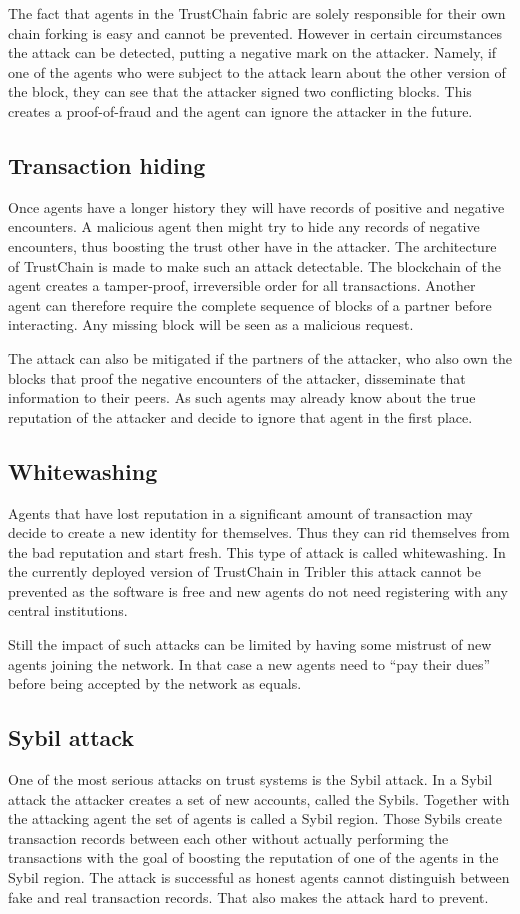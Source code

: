The fact that agents in the TrustChain fabric are solely responsible for their own chain forking is
easy and cannot be prevented. However in certain circumstances the attack can be detected, putting a
negative mark on the attacker. Namely, if one of the agents who were subject to the attack learn 
about the other version of the block, they can see that the attacker signed two conflicting blocks.
This creates a proof-of-fraud and the agent can ignore the attacker in the future. 

\subsection{Transaction hiding}
Once agents have a longer history they will have records of positive and negative encounters. A 
malicious agent then might try to hide any records of negative encounters, thus boosting the trust 
other have in the attacker. The architecture of TrustChain is made to make such an attack detectable.
The blockchain of the agent creates a tamper-proof, irreversible order for all transactions. Another
agent can therefore require the complete sequence of blocks of a partner before interacting. Any 
missing block will be seen as a malicious request. 

The attack can also be mitigated if the partners of the attacker, who also own the blocks that proof
the negative encounters of the attacker, disseminate that information to their peers. As such agents
may already know about the true reputation of the attacker and decide to ignore that agent in the 
first place.

\subsection{Whitewashing}
Agents that have lost reputation in a significant amount of transaction may decide to create a new 
identity for themselves. Thus they can rid themselves from the bad reputation and start fresh. This 
type of attack is called whitewashing. In the currently deployed version of TrustChain in Tribler 
this attack cannot be prevented as the software is free and new agents do not need registering with
any central institutions.

Still the impact of such attacks can be limited by having some mistrust of new agents joining the 
network. In that case a new agents need to ``pay their dues'' before being accepted by the network 
as equals.

\subsection{Sybil attack}
One of the most serious attacks on trust systems is the Sybil attack. In a Sybil attack the attacker
creates a set of new accounts, called the Sybils. Together with the attacking agent the set of 
agents is called a Sybil region. Those Sybils create transaction records 
between each other without actually performing the transactions with the goal of boosting the 
reputation of one of the agents in the Sybil region. The attack is successful as honest agents 
cannot distinguish between fake and real transaction records. That also makes the attack hard to 
prevent.

